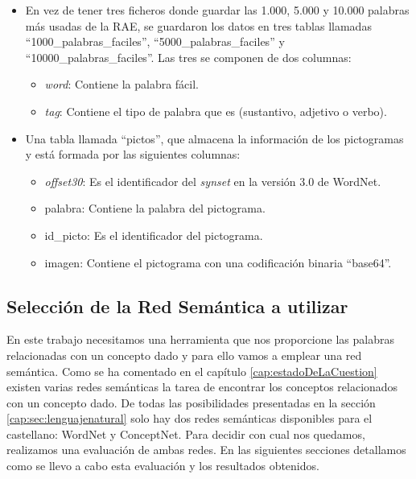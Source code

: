 \begin{itemize}
	\item En vez de tener tres ficheros donde guardar las 1.000, 5.000 y 10.000 palabras más usadas de la RAE, se guardaron los datos en tres tablas llamadas ``1000\_palabras\_faciles'', ``5000\_palabras\_faciles'' y ``10000\_palabras\_faciles''. Las tres se componen de dos columnas:
	\begin{itemize}
		\item \textit{word}: Contiene la palabra fácil.  
		\item \textit{tag}: Contiene el tipo de palabra que es (sustantivo, adjetivo o verbo).
	\end{itemize} 
	 
	 
	\item Una tabla llamada ``pictos'', que almacena la información de los pictogramas y está formada por las siguientes columnas:
	\begin{itemize}
		\item \textit{offset30}: Es el identificador del \textit{synset} en la versión 3.0 de WordNet.
		\item palabra: Contiene la palabra del pictograma.
		\item id\_picto: Es el identificador del pictograma.
		\item imagen: Contiene el pictograma con una codificación binaria ``base64''.
	\end{itemize}

\end{itemize}

\subsection{Selección de la Red Semántica a utilizar}
\label{cap:subsec:redsemanticautilizada}

En este trabajo necesitamos una herramienta que nos proporcione las palabras relacionadas con un concepto dado y para ello vamos a emplear una red semántica.
Como se ha comentado en el capítulo \ref{cap:estadoDeLaCuestion} existen varias redes semánticas la tarea de encontrar los conceptos relacionados con un concepto dado. 
De todas las posibilidades presentadas en la sección \ref{cap:sec:lenguajenatural} solo hay dos redes semánticas disponibles para el castellano: WordNet y ConceptNet. Para decidir con cual nos quedamos, realizamos una evaluación de ambas redes. En las siguientes secciones detallamos como se llevo a cabo esta evaluación y los resultados obtenidos.


